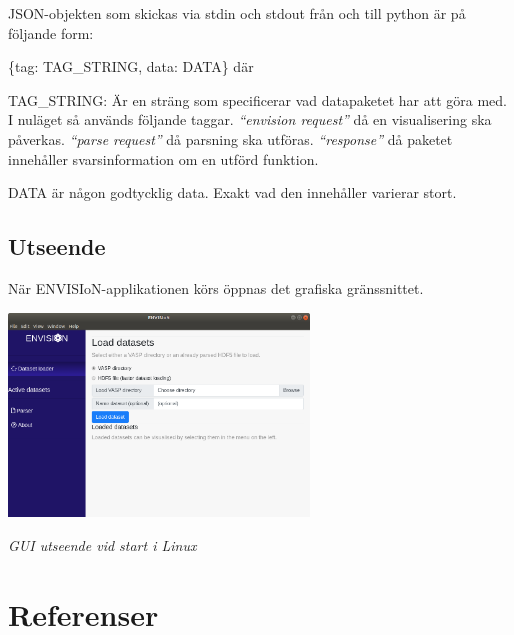 \documentclass[10pt,oneside,swedish]{article}
\begin{document}
JSON-objekten som skickas via stdin och stdout från och till python är
på följande form:

\{tag: TAG\_STRING, data: DATA\} där

TAG\_STRING: Är en sträng som specificerar vad datapaketet har att göra
med. I nuläget så används följande taggar. \emph{``envision request''}
då en visualisering ska påverkas. \emph{``parse request''} då parsning
ska utföras. \emph{``response''} då paketet innehåller svarsinformation
om en utförd funktion.

DATA är någon godtycklig data. Exakt vad den innehåller varierar stort.

\subsection{Utseende}\label{utseende}

När ENVISIoN-applikationen körs öppnas det grafiska gränssnittet.

\includegraphics[width=0.60000\textwidth]{Images/GUI_start_Ubuntu.png}

\emph{GUI utseende vid start i Linux}

\newpage
\section{Referenser}\label{referenser}
\end{document}
